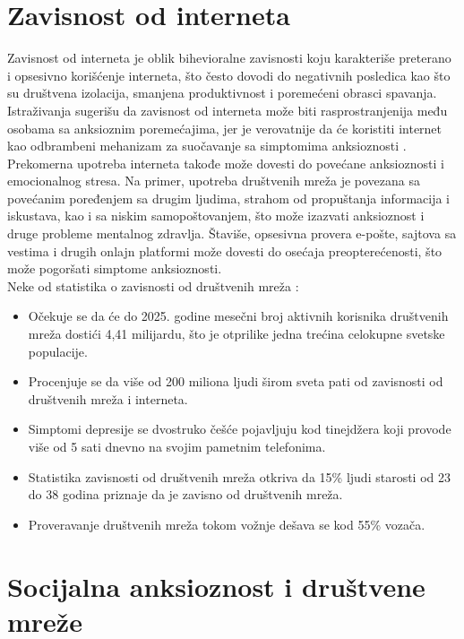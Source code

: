\documentclass[a4paper]{article}
\begin{document}
    \section{Zavisnost od interneta}
    \label{sec:podnaslov3}
        Zavisnost od interneta je oblik bihevioralne zavisnosti koju karakteriše preterano i opsesivno korišćenje interneta, što često dovodi do negativnih posledica kao što su društvena izolacija, smanjena produktivnost i poremećeni obrasci spavanja. Istraživanja sugerišu da zavisnost od interneta može biti rasprostranjenija među osobama sa anksioznim poremećajima, jer je verovatnije da će koristiti internet kao odbrambeni mehanizam za suočavanje sa simptomima anksioznosti \cite{cetvrta}.
        Prekomerna upotreba interneta takođe može dovesti do povećane anksioznosti i emocionalnog stresa. Na primer, upotreba društvenih mreža je povezana sa povećanim poređenjem sa drugim ljudima, strahom od propuštanja informacija i iskustava, kao i sa niskim samopoštovanjem, što može izazvati anksioznost i druge probleme mentalnog zdravlja. Štaviše, opsesivna provera e-pošte, sajtova sa vestima i drugih onlajn platformi može dovesti do osećaja preopterećenosti, što može pogoršati simptome anksioznosti. \\ \newline
        Neke od statistika o zavisnosti od društvenih mreža \cite{peta} :
            \begin{itemize}
		 	\item Očekuje se da će do 2025. godine mesečni broj aktivnih korisnika društvenih mreža dostići 4,41 milijardu, što je otprilike jedna trećina celokupne svetske populacije.
		 	\item Procenjuje se da više od 200 miliona ljudi širom sveta pati od zavisnosti od društvenih mreža i interneta.
		 	\item Simptomi depresije se dvostruko češće pojavljuju kod tinejdžera koji provode više od 5 sati dnevno na svojim pametnim telefonima.
		 	\item Statistika zavisnosti od društvenih mreža otkriva da 15\% ljudi starosti od 23 do 38 godina priznaje da je zavisno od društvenih mreža.
		 	\item Proveravanje društvenih mreža tokom vožnje dešava se kod 55\% vozača.
            \end{itemize}  

            \section{Socijalna anksioznost i društvene mreže}
		\label{sec:podnaslov4}
	
\end{document}
